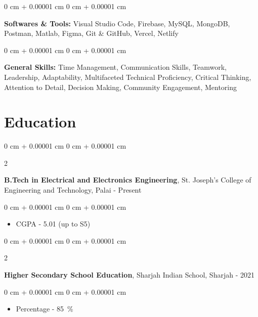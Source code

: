 \documentclass[10pt, letterpaper]{article}
\newenvironment{highlights}{
    \begin{itemize}[
        topsep=0.10 cm,
        parsep=0.10 cm,
        partopsep=0pt,
        itemsep=0pt,
        leftmargin=0 cm + 10pt
    ]
}{
    \end{itemize}
} %
\newenvironment{onecolentry}{
    \begin{adjustwidth}{
        0 cm + 0.00001 cm
    }{
        0 cm + 0.00001 cm
    }
}{
    \end{adjustwidth}
} %
\newenvironment{twocolentry}[2][]{
    \onecolentry
    \def\secondColumn{#2}
    \setcolumnwidth{\fill, 4.5 cm}
    \begin{paracol}{2}
}{
    \switchcolumn \raggedleft \secondColumn
    \end{paracol}
    \endonecolentry
} %
\begin{document}
        \vspace{0.5em}
        
        \begin{onecolentry}
            \textbf{Softwares \& Tools:} Visual Studio Code, Firebase, MySQL, MongoDB, Postman, Matlab, Figma, Git \& GitHub, Vercel, Netlify
        \end{onecolentry}
        
        \vspace{0.5em}
        
        \begin{onecolentry}
            \textbf{General Skills:} Time Management, Communication Skills, Teamwork, Leadership, Adaptability, Multifaceted Technical Proficiency, Critical Thinking, Attention to Detail, Decision Making, Community Engagement, Mentoring
        \end{onecolentry}
        
    \section{Education}
        \begin{twocolentry}{
            2021 - Present
        }
            \textbf{B.Tech in Electrical and Electronics Engineering}, St. Joseph's College of Engineering and Technology, Palai\end{twocolentry}

        \vspace{0.10 cm}
        \begin{onecolentry}
            \begin{highlights}
                \item CGPA - 5.01 (up to S5) 
            \end{highlights}
        \end{onecolentry}

        \begin{twocolentry}{
            2019 - 2021
        }
            \textbf{Higher Secondary School Education}, Sharjah Indian School, Sharjah\end{twocolentry}

        \vspace{0.10 cm}
        \begin{onecolentry}
            \begin{highlights}
                \item Percentage - \qty{85}{\percent} 
            \end{highlights}
        \end{onecolentry}
\end{document}
